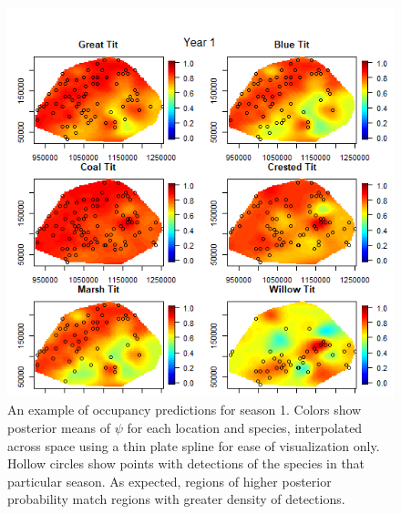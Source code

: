 \begin{figure}[ht]
  \centering
  \includegraphics[width=5.5in]{psi1.png}
  \caption{An example of occupancy predictions for season 1.  Colors show posterior means of $\psi$ for each location and species, interpolated across space using a thin plate spline for ease of visualization only.  Hollow circles show points with detections of the species in that particular season.  As expected, regions of higher posterior probability match regions with greater density of detections.}
  \label{figure:psi1}
\end{figure}

\clearpage

